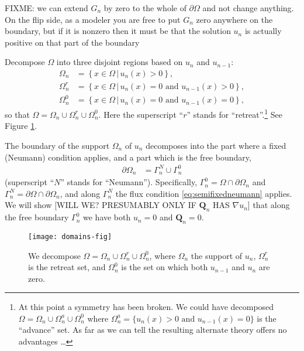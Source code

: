 \documentclass[final,leqno,onefignum,onetabnum]{siamltex1213bueler}
\newcommand\bQ{\mathbf{Q}}
\renewcommand{\grad}{\nabla}
\begin{document}
FIXME: we can extend $G_n$ by zero to the whole of $\partial \Omega$ and not change anything.  On the flip side, as a modeler you are free to put $G_n$ zero anywhere on the boundary, but if it is nonzero then it must be that the solution $u_n$ is actually positive on that part of the boundary

Decompose $\Omega$ into three disjoint regions based on $u_n$ and $u_{n-1}$:
\begin{align*}
\Omega_n &= \left\{x \in \Omega \,\big|\, u_n(x)>0\right\}, \\
\Omega_n^r &= \left\{x \in \Omega \,\big|\, u_n(x)=0 \text{ and } u_{n-1}(x) > 0\right\}, \\
\Omega_n^0 &= \left\{x \in \Omega \,\big|\, u_n(x)=0 \text{ and } u_{n-1}(x) = 0\right\},
\end{align*}
so that $\Omega = \Omega_n \cup \Omega_n^r \cup \Omega_n^0$.  Here the superscript ``$r$'' stands for ``retreat''.\footnote{At this point a symmetry has been broken.  We could have decomposed $\Omega= \Omega_n \cup \Omega_n^a \cup \Omega_n^0$ where $\Omega_n^a = \{u_n(x) > 0 \text{ and } u_{n-1}(x) = 0\}$ is the ``advance'' set.  As far as we can tell the resulting alternate theory offers no advantages \dots}  See Figure \ref{fig:domains}.

The boundary of the support $\Omega_n$ of $u_n$ decomposes into the part where a fixed (Neumann) condition applies, and a part which is the free boundary,
\begin{align*}
\partial\Omega_n &= \Gamma_n^N \cup \Gamma_n^0
\end{align*}
(superscript ``$N$'' stands for ``Neumann'').  Specifically, $\Gamma_n^0 = \Omega \cap \partial \Omega_n$ and $\Gamma_n^N = \partial \Omega \cap \partial \Omega_n$, and along $\Gamma_n^N$ the flux condition \eqref{eq:semifixedneumann} applies.  We will show [WILL WE?  PRESUMABLY ONLY IF $\bQ_n$ HAS $\grad u_n$] that along the free boundary $\Gamma_n^0$ we have both $u_n=0$ and $\bQ_n = 0$.

\begin{figure}[ht]
\begin{center}
\texttt{[image: domains-fig]}
\end{center}
\caption{We decompose $\Omega = \Omega_n \cup \Omega_n^r \cup \Omega_n^0$, where $\Omega_n$ the support of $u_n$, $\Omega_n^r$ is the retreat set, and $\Omega_n^0$ is the set on which both $u_{n-1}$ and $u_n$ are zero.}
\label{fig:domains}
\end{figure}
\end{document}
